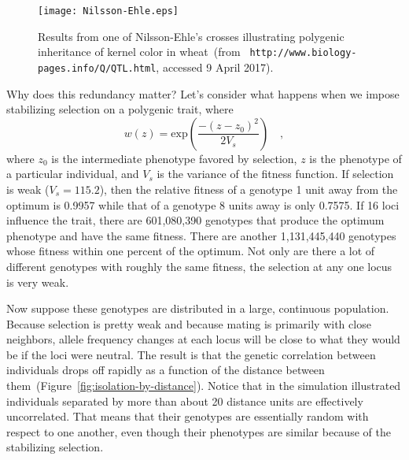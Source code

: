 \begin{figure}
  \begin{center}
    \texttt{[image: Nilsson-Ehle.eps]}
  \end{center}
  \caption{Results from one of Nilsson-Ehle's crosses illustrating
    polygenic inheritance of kernel color in wheat~(from {\tt
      http://www.biology-pages.info/Q/QTL.html}, accessed 9 April 2017).}\label{fig:redundancy}
\end{figure}

Why does this redundancy matter? Let's consider what happens when we
impose stabilizing selection on a polygenic trait, where
$$
w(z) = \mbox{exp}\left(\frac{-(z - z_0)^2}{2V_s}\right) \quad ,
$$
where $z_0$ is the intermediate phenotype favored by selection, $z$ is
the phenotype of a particular individual, and $V_s$ is the variance of
the fitness function. If selection is weak ($V_s = 115.2$), then the
relative fitness of a genotype 1 unit away from the optimum is 0.9957
while that of a genotype 8 units away is only 0.7575. If 16 loci
influence the trait, there are 601,080,390 genotypes that produce the
optimum phenotype and have the same fitness. There are another
1,131,445,440 genotypes whose fitness within one percent of the
optimum. Not only are there a lot of different genotypes with roughly
the same fitness, the selection at any one locus is very weak.

Now suppose these genotypes are distributed in a large, continuous
population. Because selection is pretty weak and because mating is
primarily with close neighbors, allele frequency changes at each locus
will be close to what they would be if the loci were neutral. The
result is that the genetic correlation between individuals drops off
rapidly as a function of the distance between
them~(Figure~\ref{fig:isolation-by-distance}). Notice that in the
simulation illustrated individuals separated by more than about 20
distance units are effectively uncorrelated. That means that their
genotypes are essentially random with respect to one another, even
though their phenotypes are similar because of the stabilizing
selection. 

